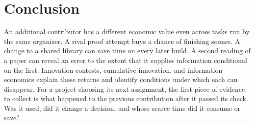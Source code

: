 \documentclass[11pt,letterpaper]{article}
\begin{document}
\section{Conclusion}

An additional contributor has a different economic value even across tasks run by the same organizer. A rival proof attempt buys a chance of finishing sooner. A change to a shared library can save time on every later build. A second reading of a paper can reveal an error to the extent that it supplies information conditional on the first. Innovation contests, cumulative innovation, and information economics explain these returns and identify conditions under which each can disappear. For a project choosing its next assignment, the first piece of evidence to collect is what happened to the previous contribution after it passed its check. Was it used, did it change a decision, and whose scarce time did it consume or save?


\end{document}
